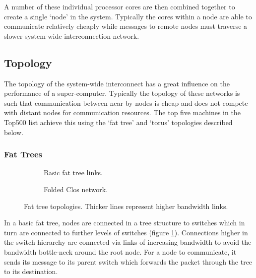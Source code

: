 			A number of these individual processor cores are then combined together to
			create a single `node' in the system. Typically the cores within a node
			are able to communicate relatively cheaply while messages to remote nodes
			must traverse a slower system-wide interconnection network.
		
		\subsection{Topology}
			
			The topology of the system-wide interconnect has a great influence on the
			performance of a super-computer. Typically the topology of these networks
			is such that communication between near-by nodes is cheap and does not
			compete with distant nodes for communication resources. The top five
			machines in the Top500 list achieve this using the `fat tree' and `torus'
			topologies described below.
			
			\subsubsection{Fat Trees}
				
				\begin{figure}
					\begin{subfigure}[t]{\textwidth}
						\center
						
						\caption{Basic fat tree links.}
						\label{fig:fat-tree-concept}
					\end{subfigure}
					
					\vspace{1.5em}
					
					\begin{subfigure}[t]{\textwidth}
						\center
						
						\caption{Folded Clos network.}
						\label{fig:fat-tree-closs}
					\end{subfigure}
					
					\caption[Fat tree topologies.]{Fat tree topologies. Thicker lines
					represent higher bandwidth links.}
					\label{fig:fat-tree}
				\end{figure}
			
				In a basic fat tree, nodes are connected in a tree structure to switches
				which in turn are connected to further levels of switches (figure
				\ref{fig:fat-tree-concept}). Connections higher in the switch hierarchy
				are connected via links of increasing bandwidth to avoid the bandwidth
				bottle-neck around the root node. For a node to communicate, it
				sends its message to its parent switch which forwards the packet through
				the tree to its destination.
				
